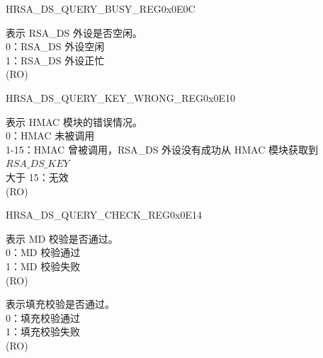 \begin{register}{H}{RSA\_DS\_QUERY\_BUSY\_REG}{0x0E0C}\label{regdesc:RSADSQUERYBUSYREG}
%
%
\regnewline%
\begin{regdesc}\begin{reglist}
\label{fielddesc:RSADSQUERYBUSY}\item [RSA\_DS\_QUERY\_BUSY] 表示 RSA\_DS 外设是否空闲。\\
0：RSA\_DS 外设空闲\\
1：RSA\_DS 外设正忙\\
(RO)
\end{reglist}\end{regdesc}
\end{register}


\begin{register}{H}{RSA\_DS\_QUERY\_KEY\_WRONG\_REG}{0x0E10}\label{regdesc:RSADSQUERYKEYWRONGREG}
%
%
\regnewline%
\begin{regdesc}\begin{reglist}
\label{fielddesc:RSADSQUERYKEYWRONG}\item [RSA\_DS\_QUERY\_KEY\_WRONG] 表示 HMAC 模块的错误情况。\\
0：HMAC 未被调用\\
1-15：HMAC 曾被调用，RSA\_DS 外设没有成功从 HMAC 模块获取到 \begin{math}RSA\_DS\_KEY\end{math}\\
大于 15：无效\\
(RO)
\end{reglist}\end{regdesc}
\end{register}


\begin{register}{H}{RSA\_DS\_QUERY\_CHECK\_REG}{0x0E14}\label{regdesc:RSADSQUERYCHECKREG}
%
%
%
\regnewline%
\begin{regdesc}\begin{reglist}
\label{fielddesc:RSADSMDERROR}\item [RSA\_DS\_MD\_ERROR] 表示 MD 校验是否通过。\\
0：MD 校验通过\\
1：MD 校验失败\\
(RO)
\label{fielddesc:RSADSPADDINGBAD}\item [RSA\_DS\_PADDING\_BAD] 表示填充校验是否通过。\\
0：填充校验通过\\
1：填充校验失败\\
(RO)
\end{reglist}\end{regdesc}
\end{register}


